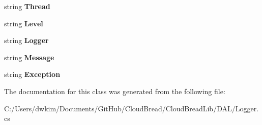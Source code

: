 \begin{DoxyCompactItemize}
\item 
string {\bfseries Thread}\hypertarget{class_cloud_bread_lib_1_1_d_a_l_1_1_logger_1_1_c_b_a_t_s_message_entity_af7db60deee306708cd86edb69acbc86c}{}\label{class_cloud_bread_lib_1_1_d_a_l_1_1_logger_1_1_c_b_a_t_s_message_entity_af7db60deee306708cd86edb69acbc86c}

\item 
string {\bfseries Level}\hypertarget{class_cloud_bread_lib_1_1_d_a_l_1_1_logger_1_1_c_b_a_t_s_message_entity_a3cf1d50a949962f3833142a52cacdd31}{}\label{class_cloud_bread_lib_1_1_d_a_l_1_1_logger_1_1_c_b_a_t_s_message_entity_a3cf1d50a949962f3833142a52cacdd31}

\item 
string {\bfseries Logger}\hypertarget{class_cloud_bread_lib_1_1_d_a_l_1_1_logger_1_1_c_b_a_t_s_message_entity_a0e5a22fa79757a90b6afc8832e6ceffa}{}\label{class_cloud_bread_lib_1_1_d_a_l_1_1_logger_1_1_c_b_a_t_s_message_entity_a0e5a22fa79757a90b6afc8832e6ceffa}

\item 
string {\bfseries Message}\hypertarget{class_cloud_bread_lib_1_1_d_a_l_1_1_logger_1_1_c_b_a_t_s_message_entity_a502ed1378ed622cf1a13a6649ff1afce}{}\label{class_cloud_bread_lib_1_1_d_a_l_1_1_logger_1_1_c_b_a_t_s_message_entity_a502ed1378ed622cf1a13a6649ff1afce}

\item 
string {\bfseries Exception}\hypertarget{class_cloud_bread_lib_1_1_d_a_l_1_1_logger_1_1_c_b_a_t_s_message_entity_a92f31fabac35ccf19e1f9fc8dfb10aee}{}\label{class_cloud_bread_lib_1_1_d_a_l_1_1_logger_1_1_c_b_a_t_s_message_entity_a92f31fabac35ccf19e1f9fc8dfb10aee}

\end{DoxyCompactItemize}


The documentation for this class was generated from the following file\+:\begin{DoxyCompactItemize}
\item 
C\+:/\+Users/dwkim/\+Documents/\+Git\+Hub/\+Cloud\+Bread/\+Cloud\+Bread\+Lib/\+D\+A\+L/Logger.\+cs\end{DoxyCompactItemize}
